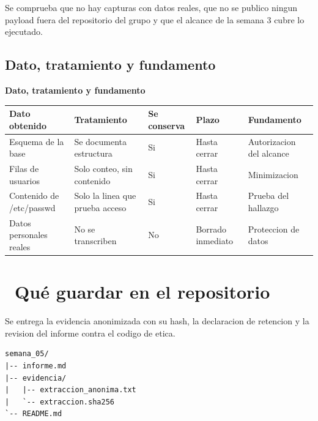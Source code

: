 \documentclass[11pt,a4paper]{article}
\newcommand{\iconotexto}[2]{\textcolor{cyanNeon}{\faIcon{#1}}~#2}
\begin{document}
Se comprueba que no hay capturas con datos reales, que no se publico ningun payload fuera del repositorio del grupo y que el alcance de la semana 3 cubre lo ejecutado.

\subsection{Dato, tratamiento y fundamento}

\begin{center}
\begin{minipage}{\linewidth}
\centering
{\footnotesize
\textbf{Dato, tratamiento y fundamento}\par\smallskip
\begin{tabular}{@{}>{\raggedright\arraybackslash}p{3.00cm}>{\raggedright\arraybackslash}p{3.20cm}>{\raggedright\arraybackslash}p{1.60cm}>{\raggedright\arraybackslash}p{2.00cm}>{\raggedright\arraybackslash}p{3.60cm}@{}}
\toprule
\textbf{Dato obtenido} & \textbf{Tratamiento} & \textbf{Se conserva} & \textbf{Plazo} & \textbf{Fundamento} \\
\midrule
Esquema de la base & Se documenta estructura & Si & Hasta cerrar & Autorizacion del alcance \\
Filas de usuarios & Solo conteo, sin contenido & Si & Hasta cerrar & Minimizacion \\
Contenido de /etc/passwd & Solo la linea que prueba acceso & Si & Hasta cerrar & Prueba del hallazgo \\
Datos personales reales & No se transcriben & No & Borrado inmediato & Proteccion de datos \\
\bottomrule
\end{tabular}
}
\par{}
\end{minipage}
\end{center}

\section{\iconotexto{box-open}{Qué guardar en el repositorio}}

Se entrega la evidencia anonimizada con su hash, la declaracion de retencion y la revision del informe contra el codigo de etica.

\begin{lstlisting}[style=estiloCodigo]
semana_05/
|-- informe.md
|-- evidencia/
|   |-- extraccion_anonima.txt
|   `-- extraccion.sha256
`-- README.md
\end{lstlisting}
\end{document}

